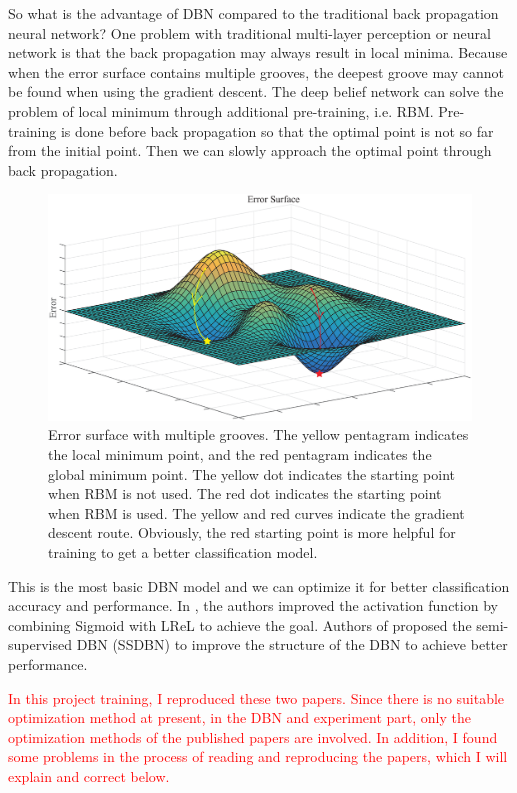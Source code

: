 \documentclass{modified}
\begin{document}
So what is the advantage of DBN compared to the traditional back propagation neural network? One problem with traditional multi-layer perception or neural network is that the back propagation may always result in local minima. Because when the error surface contains multiple grooves, the deepest groove may cannot be found when using the gradient descent. The deep belief network can solve the problem of local minimum through additional pre-training, i.e. RBM. Pre-training is done before back propagation so that the optimal point is not so far from the initial point. Then we can slowly approach the optimal point through back propagation.

\begin{figure}[htbp]
	\centering
	\includegraphics[width=\columnwidth]{surface.eps}
	\caption{Error surface with multiple grooves. The yellow pentagram indicates the local minimum point, and the red pentagram indicates the global minimum point. The yellow dot indicates the starting point when RBM is not used. The red dot indicates the starting point when RBM is used. The yellow and red curves indicate the gradient descent route. Obviously, the red starting point is more helpful for training to get a better classification model.}
	\label{fig:surface}
\end{figure}

This is the most basic DBN model and we can optimize it for better classification accuracy and performance. In \cite{YiThe}, the authors improved the activation function by combining Sigmoid with LReL to achieve the goal. Authors of \cite{wang2017improved} proposed the semi-supervised DBN (SSDBN) to improve the structure of the DBN to achieve better performance.

\textcolor{red}{In this project training, I reproduced these two papers. Since there is no suitable optimization method at present, in the DBN and experiment part, only the optimization methods of the published papers are involved. In addition, I found some problems in the process of reading and reproducing the papers, which I will explain and correct below.}
\end{document}
